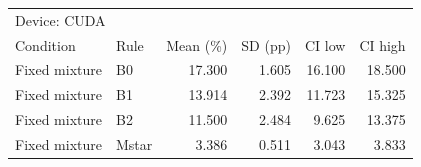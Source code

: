 \begin{tabular}{llrrrr}
\toprule
\multicolumn{6}{l}{Device: CUDA} \\
Condition & Rule & Mean (\%) & SD (pp) & CI low & CI high \\
\midrule
Fixed mixture & B0 & 17.300 & 1.605 & 16.100 & 18.500 \\
Fixed mixture & B1 & 13.914 & 2.392 & 11.723 & 15.325 \\
Fixed mixture & B2 & 11.500 & 2.484 & 9.625 & 13.375 \\
Fixed mixture & Mstar & 3.386 & 0.511 & 3.043 & 3.833 \\
\bottomrule
\end{tabular}
